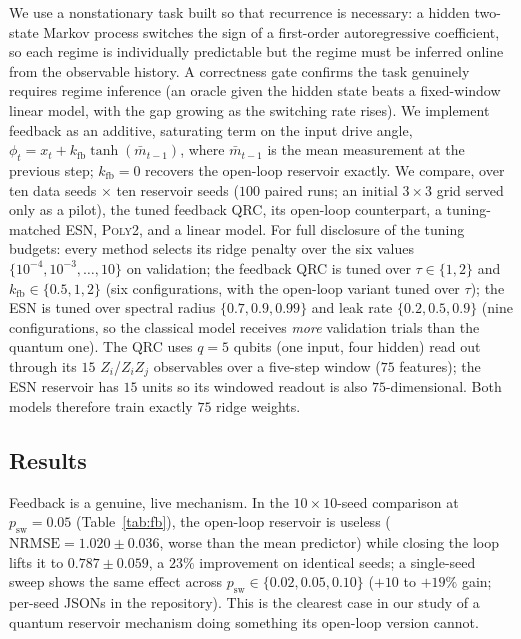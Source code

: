 ﻿\documentclass[10pt,conference]{IEEEtran}
\newcommand{\nrmse}{\mathrm{NRMSE}}
\begin{document}
We use a nonstationary task built so that recurrence is necessary: a hidden
two-state Markov process switches the sign of a first-order autoregressive
coefficient, so each regime is individually predictable but the regime must be
inferred online from the observable history. A correctness gate confirms the task
genuinely requires regime inference (an oracle given the hidden state beats a
fixed-window linear model, with the gap growing as the switching rate rises). We
implement feedback as an additive, saturating term on the input drive angle,
$\phi_t = x_t + k_{\mathrm{fb}}\tanh(\bar m_{t-1})$, where $\bar m_{t-1}$ is the
mean measurement at the previous step; $k_{\mathrm{fb}}=0$ recovers the open-loop
reservoir exactly. We compare, over ten data seeds $\times$ ten reservoir seeds
($100$ paired runs; an initial $3\times3$ grid served only as a pilot), the tuned
feedback QRC, its open-loop counterpart, a tuning-matched ESN, \textsc{Poly2},
and a linear model. For full disclosure of the tuning budgets: every method
selects its ridge penalty over the six values
$\{10^{-4},10^{-3},\dots,10\}$ on validation; the feedback QRC is tuned over
$\tau\in\{1,2\}$ and $k_{\mathrm{fb}}\in\{0.5,1,2\}$ (six configurations, with
the open-loop variant tuned over $\tau$); the ESN is tuned over spectral radius
$\{0.7,0.9,0.99\}$ and leak rate $\{0.2,0.5,0.9\}$ (nine configurations, so the
classical model receives \emph{more} validation trials than the quantum one).
The QRC uses $q=5$ qubits (one input, four hidden) read out through its $15$
$Z_i$/$Z_iZ_j$ observables over a five-step window ($75$ features); the ESN
reservoir has $15$ units so its windowed readout is also $75$-dimensional. Both
models therefore train exactly $75$ ridge weights.

\subsection{Results}

Feedback is a genuine, live mechanism. In the $10\times10$-seed comparison at
$p_{\mathrm{sw}}=0.05$ (Table~\ref{tab:fb}), the open-loop reservoir is useless
($\nrmse = 1.020 \pm 0.036$, worse than the mean predictor) while closing the
loop lifts it to $0.787 \pm 0.059$, a $23\%$ improvement on identical seeds; a
single-seed sweep shows the same effect across
$p_{\mathrm{sw}}\in\{0.02,0.05,0.10\}$ ($+10$ to $+19\%$ gain; per-seed JSONs in
the repository). This is the clearest case in our study of a quantum reservoir
mechanism doing something its open-loop version cannot.
\end{document}
